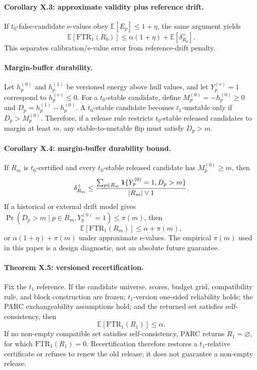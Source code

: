 \paragraph{Corollary X.3: approximate validity plus reference drift.}
If \(t_0\)-false-candidate e-values obey \(\mathbb E[E_p]\le 1+\eta\), the
same argument yields
\[
\mathbb E[\mathrm{FTR}_1(R_0)]\le \alpha(1+\eta)+\mathbb E[\delta_{R_0}^+].
\]
This separates calibration/e-value error from reference-drift penalty.

\paragraph{Margin-buffer durability.}
Let \(h_p^{(0)}\) and \(h_p^{(1)}\) be versioned energy above hull values, and
let \(Y_p^{(v)}=1\) correspond to \(h_p^{(v)}\le 0\).  For a \(t_0\)-stable
candidate, define \(M_p^{(0)}=-h_p^{(0)}\ge 0\) and
\(D_p=h_p^{(1)}-h_p^{(0)}\).  A \(t_0\)-stable candidate becomes \(t_1\)-unstable
only if \(D_p>M_p^{(0)}\).  Therefore, if a release rule restricts \(t_0\)-stable
released candidates to margin at least \(m\), any stable-to-unstable flip must
satisfy \(D_p>m\).

\paragraph{Corollary X.4: margin-buffer durability bound.}
If \(R_m\) is \(t_0\)-certified and every \(t_0\)-stable released candidate
has \(M_p^{(0)}\ge m\), then
\[
\delta_{R_m}^+
\le
\frac{\sum_{p\in R_m}{\bf 1}\{Y_p^{(0)}=1,D_p>m\}}{|R_m|\vee1}.
\]
If a historical or external drift model gives
\(\Pr(D_p>m\mid p\in R_m,Y_p^{(0)}=1)\le \pi(m)\), then
\[
\mathbb E[\mathrm{FTR}_1(R_m)]\le \alpha+\pi(m),
\]
or \(\alpha(1+\eta)+\pi(m)\) under approximate e-values.  The empirical
\(\pi(m)\) used in this paper is a design diagnostic, not an absolute future
guarantee.

\paragraph{Theorem X.5: versioned recertification.}
Fix the \(t_1\) reference.  If the candidate universe, scores, budget grid,
compatibility rule, and block construction are frozen; \(t_1\)-version
one-sided reliability holds; the PARC exchangeability assumptions hold; and the
returned set satisfies self-consistency, then
\[
\mathbb E[\mathrm{FTR}_1(R_1)]\le \alpha.
\]
If no non-empty compatible set satisfies self-consistency, PARC returns
\(R_1=\varnothing\), for which \(\mathrm{FTR}_1(R_1)=0\).  Recertification
therefore restores a \(t_1\)-relative certificate or refuses to renew the old
release; it does not guarantee a non-empty release.
